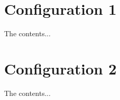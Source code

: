 \documentclass[class=book, crop=false]{standalone}
\begin{document}
\section{Configuration 1}
The contents...

\section{Configuration 2}
The contents...
\end{document}
